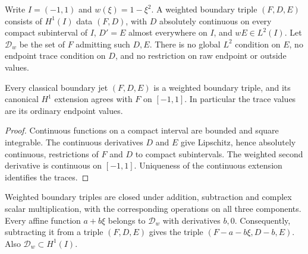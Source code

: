 \begin{definition}
\label{def:weighted-boundary-domain}
\leanok
Write $I=(-1,1)$ and $w(\xi)=1-\xi^2$. A weighted boundary triple $(F,D,E)$
consists of $H^1(I)$ data $(F,D)$, with $D$ absolutely continuous on every
compact subinterval of $I$, $D'=E$ almost everywhere on $I$, and
$wE\in L^2(I)$. Let $\mathcal D_w$ be the set of $F$ admitting such $D,E$.
There is no global $L^2$ condition on $E$, no endpoint trace condition on
$D$, and no restriction on raw endpoint or outside values.
\end{definition}

\begin{lemma}
\label{lem:boundary-jet-weighted}
\leanok
Every classical boundary jet $(F,D,E)$ is a weighted boundary triple, and
its canonical $H^1$ extension agrees with $F$ on $[-1,1]$. In particular
the trace values are its ordinary endpoint values.
\end{lemma}

\begin{proof}
\leanok
Continuous functions on a compact interval are bounded and square
integrable. The continuous derivatives $D$ and $E$ give Lipschitz, hence
absolutely continuous, restrictions of $F$ and $D$ to compact subintervals.
The weighted second derivative is continuous on $[-1,1]$. Uniqueness of the
continuous extension identifies the traces.
\end{proof}

\begin{lemma}
\label{lem:weighted-boundary-linear}
\leanok
Weighted boundary triples are closed under addition, subtraction and complex
scalar multiplication, with the corresponding operations on all three
components. Every affine function $a+b\xi$ belongs to $\mathcal D_w$ with
derivatives $b,0$. Consequently, subtracting it from a triple $(F,D,E)$
gives the triple $(F-a-b\xi,D-b,E)$. Also $\mathcal D_w\subset H^1(I)$.
\end{lemma}

